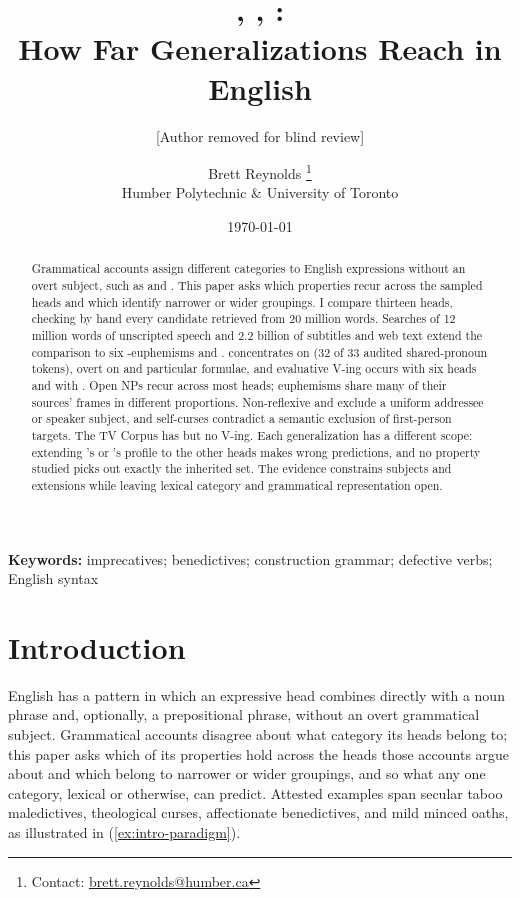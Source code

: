 \documentclass[12pt]{article}
\title{\mention{Damn him to hell}, \mention{fuck me for giving a shit}, \mention{thank you for coming}:\\How Far Generalizations Reach in English}
\author{[Author removed for blind review]}
\author{Brett Reynolds \orcidlink{0000-0003-0073-7195}%
\thanks{Contact: \href{mailto:brett.reynolds@humber.ca}{brett.reynolds@humber.ca}}\\
Humber Polytechnic \& University of Toronto}
\date{\today}
\begin{document}
\maketitle

\begin{abstract}
Grammatical accounts assign different categories to English expressions without an overt subject, such as  and . This paper asks which properties recur across the sampled heads and which identify narrower or wider groupings. I compare thirteen heads, checking by hand every candidate retrieved from 20 million words. Searches of 12 million words of unscripted speech and 2.2 billion of subtitles and web text extend the comparison to six -euphemisms and .  concentrates on  (32 of 33 audited shared-pronoun tokens), overt  on  and particular  formulae, and evaluative  V-ing occurs with six heads and with . Open NPs recur across most heads; euphemisms share many of their sources' frames in different proportions. Non-reflexive  and  exclude a uniform addressee or speaker subject, and self-curses contradict a semantic exclusion of first-person targets. The TV Corpus has  but no  V-ing. Each generalization has a different scope: extending 's or 's profile to the other heads makes wrong predictions, and no property studied picks out exactly the inherited set. The evidence constrains subjects and extensions while leaving lexical category and grammatical representation open.
\end{abstract}

\noindent\textbf{Keywords:} imprecatives; benedictives; construction grammar; defective verbs; English syntax

\section{Introduction}
\label{sec:intro}

English has a pattern in which an expressive head combines directly with a noun phrase and, optionally, a prepositional phrase, without an overt grammatical subject. Grammatical accounts disagree about what category its heads belong to; this paper asks which of its properties hold across the heads those accounts argue about and which belong to narrower or wider groupings, and so what any one category, lexical or otherwise, can predict. Attested examples span secular taboo maledictives, theological curses, affectionate benedictives, and mild minced oaths, as illustrated in (\ref{ex:intro-paradigm}).
\end{document}

